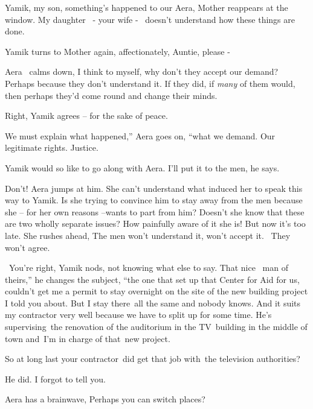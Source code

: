 \documentclass[12pt]{book}
\begin{document}
{\textquotedbl}Yamik, my son, something's happened to our Aera,{\textquotedbl} Mother reappears at the window.
{\textquotedbl}My daughter \ {}- your wife - \ doesn't understand how these things are done.{\textquotedbl}

Yamik turns to Mother again, affectionately, {\textquotedbl}Auntie, please -{\textquotedbl}

Aera \ calms down, {\textquotedbl}I think to myself, why don't they accept our demand? Perhaps because they don't
understand it. If they did, if \textit{many} of them would, then perhaps they'd come round and change their
minds.{\textquotedbl}

{\textquotedbl}Right,{\textquotedbl} Yamik agrees -- for the sake of peace.

{\textquotedbl}We must explain what happened,'' Aera goes on, ``what we demand. Our legitimate rights.
Justice.{\textquotedbl}

Yamik would so like to go along with Aera. {\textquotedbl}I'll put it to the men,{\textquotedbl} he says.

{\textquotedbl}Don't!{\textquotedbl} Aera jumps at him. She can't understand what induced her to speak this way to
Yamik. Is she trying to convince him to stay away from the men because she -- for her own reasons --wants to part from
him? Doesn't she know that these are two wholly separate issues? How painfully aware of it she is! But now it's too
late. She rushes ahead, {\textquotedbl}The men won't understand it, won't accept it.~ They won't agree.{\textquotedbl}

~{\textquotedbl}You're right,{\textquotedbl} Yamik nods, not knowing what else to say. {\textquotedbl}That nice \ man of
theirs,'' he changes the subject, ``the one that set up that Center for Aid for us, couldn't get me a permit to stay
overnight on the site of the new building project I told you about. But I stay there~all the same and nobody knows. And
it suits my contractor very well because we have to split up for some time. He's supervising~the renovation of the
auditorium in the TV~building in the middle of town and~I'm in charge of that~new project.{\textquotedbl}

{\textquotedbl}So at long last your contractor~did get that job with~the television authorities?{\textquotedbl}

{\textquotedbl}He did. I forgot to tell you.{\textquotedbl}

Aera has a brainwave, {\textquotedbl}Perhaps you can switch places?{\textquotedbl}
\end{document}
